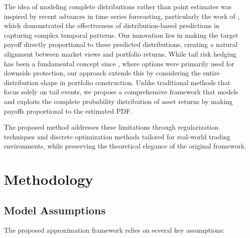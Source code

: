 \documentclass[12pt]{article}
\begin{document}
The idea of modeling complete distributions rather than point estimates was inspired by recent 
advances in time series forecasting, particularly the work of \citep{ansari2024chronos}, which 
demonstrated the effectiveness of distribution-based predictions in capturing complex temporal 
patterns. Our innovation lies in making the target payoff directly proportional to these 
predicted distributions, creating a natural alignment between market views and portfolio returns. 
While tail risk hedging has been a fundamental concept since \citep{BlackScholes1973}, where 
options were primarily used for downside protection, our approach extends this by considering 
the entire distribution shape in portfolio construction. Unlike traditional methods that focus 
solely on tail events, we propose a comprehensive framework that models and exploits the 
complete probability distribution of asset returns by making payoffs proportional to the 
estimated PDF.

The proposed method addresses these limitations through regularization techniques and 
discrete optimization methods tailored for real-world trading environments, while 
preserving the theoretical elegance of the original framework.

\section{Methodology}
\subsection{Model Assumptions}
The proposed approximation framework relies on several key assumptions:
\end{document}
